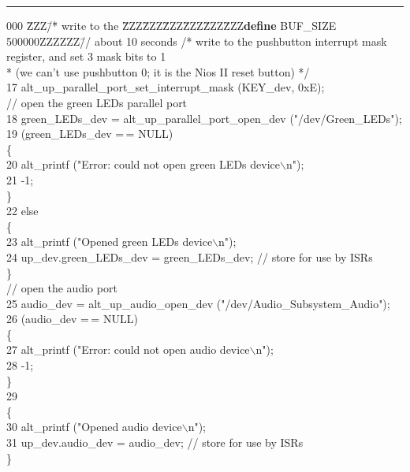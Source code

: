 \documentclass[11pt, twoside, pdftex]{article}
\begin{document}
\begin{table}
\begin{center}
\begin{minipage}[t]{12.5 cm}
\begin{tabbing}
\rule{6.0in}{0in} 
000 \=ZZZ\=/\=* write to the  \=ZZZ\=ZZZ\=ZZZ\=ZZZ\=ZZZ\=ZZZ\={\bf define} BUF\_SIZE 500000ZZZZZZ\=// about 10 seconds \kill
\>\>/* write to the pushbutton interrupt mask register, and set 3 mask bits to 1 \\
\>\>\>* (we can't use pushbutton 0; it is the Nios II reset button) */\\
17 \>\>alt\_up\_parallel\_port\_set\_interrupt\_mask (KEY\_dev, 0xE);\\
\>\>// open the green LEDs parallel port\\
18 \>\>green\_LEDs\_dev = alt\_up\_parallel\_port\_open\_dev ("/dev/Green\_LEDs");\\
19 \> (green\_LEDs\_dev =$\,$= NULL)\\
\>\>\{\\
20 \>\>\>alt\_printf ("Error: could not open green LEDs device$\backslash$n");\\
21 \>\> -1;\\
\>\>\}\\
22 \>\>else\\
\>\>\{\\
23 \>\>\>alt\_printf ("Opened green LEDs device$\backslash$n");\\
24 \>\>\>up\_dev.green\_LEDs\_dev = green\_LEDs\_dev;	// store for use by ISRs\\
\>\>\}\\
\>\>// open the audio port\\
25 \>\>audio\_dev = alt\_up\_audio\_open\_dev ("/dev/Audio\_Subsystem\_Audio");\\
26 \> (audio\_dev =$\,$= NULL)\\
\>\>\{\\
27 \>\>\>alt\_printf ("Error: could not open audio device$\backslash$n");\\
28 \>\> -1;\\
\>\>\}\\
29 \>\\
\>\>\{\\
30 \>\>\>alt\_printf ("Opened audio device$\backslash$n");\\
31 \>\>\>up\_dev.audio\_dev = audio\_dev;	// store for use by ISRs\\
\>\>\}\\

\end{tabbing}
\end{minipage}
\end{center}
\end{table}
\end{document}
